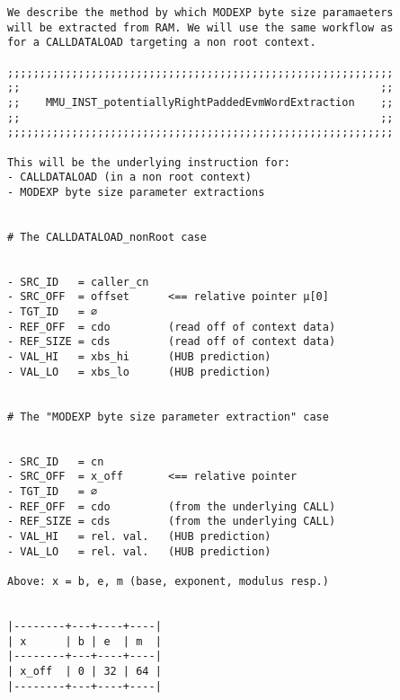 \documentclass[varwidth=\maxdimen,margin=0.5cm,multi={verbatim}]{standalone}
\begin{document}
\begin{verbatim}
We describe the method by which MODEXP byte size paramaeters
will be extracted from RAM. We will use the same workflow as
for a CALLDATALOAD targeting a non root context.

;;;;;;;;;;;;;;;;;;;;;;;;;;;;;;;;;;;;;;;;;;;;;;;;;;;;;;;;;;;;
;;                                                        ;;
;;    MMU_INST_potentiallyRightPaddedEvmWordExtraction    ;;
;;                                                        ;;
;;;;;;;;;;;;;;;;;;;;;;;;;;;;;;;;;;;;;;;;;;;;;;;;;;;;;;;;;;;;

This will be the underlying instruction for:
- CALLDATALOAD (in a non root context)
- MODEXP byte size parameter extractions


# The CALLDATALOAD_nonRoot case


- SRC_ID   = caller_cn
- SRC_OFF  = offset      <== relative pointer µ[0]
- TGT_ID   = ∅
- REF_OFF  = cdo         (read off of context data)
- REF_SIZE = cds         (read off of context data)
- VAL_HI   = xbs_hi      (HUB prediction)
- VAL_LO   = xbs_lo      (HUB prediction)


# The "MODEXP byte size parameter extraction" case


- SRC_ID   = cn
- SRC_OFF  = x_off       <== relative pointer
- TGT_ID   = ∅
- REF_OFF  = cdo         (from the underlying CALL)
- REF_SIZE = cds         (from the underlying CALL)
- VAL_HI   = rel. val.   (HUB prediction)
- VAL_LO   = rel. val.   (HUB prediction)

Above: x = b, e, m (base, exponent, modulus resp.)


|--------+---+----+----|
| x      | b | e  | m  |
|--------+---+----+----|
| x_off  | 0 | 32 | 64 |
|--------+---+----+----|

\end{verbatim}
\end{document}
